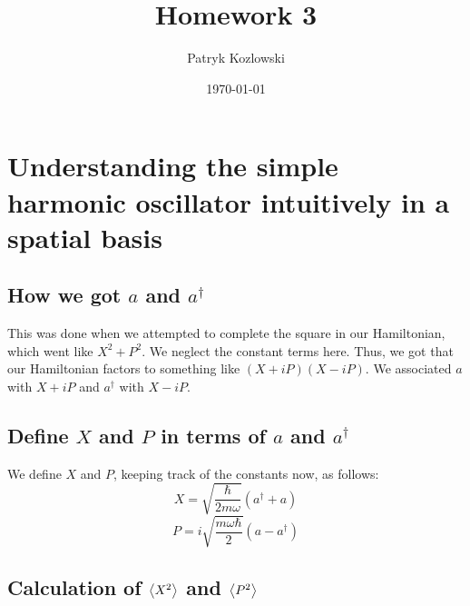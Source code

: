 \documentclass[12pt]{article}
\title{Homework 3}
\author{Patryk Kozlowski}
\date{\today}
\begin{document}
\maketitle


\section{Understanding the simple harmonic oscillator intuitively in a spatial basis}

\subsection{How we got \(a\) and \(a^{\dagger}\)}
This was done when we attempted to complete the square in our Hamiltonian, which went like $X^{2}+P^{2}$. We neglect the constant terms here. Thus, we got that our Hamiltonian factors to something like $(X+iP)(X-iP)$. We associated $a$ with $X+iP$ and $a^{\dagger}$ with $X-iP$.
\subsection{Define \(X\) and \(P\) in terms of \(a\) and \(a^{\dagger}\)}

We define \(X\) and \(P\), keeping track of the constants now, as follows:
\begin{equation}
    X = \sqrt{\frac{\hbar}{2m\omega}}(a^{\dagger} + a)
\end{equation}
\begin{equation}
    P = i\sqrt{\frac{m\omega\hbar}{2}}(a - a^{\dagger})
\end{equation}
\subsection{Calculation of \(\ev{X^2} \) and \(\ev{P^2}\)}
\end{document}
